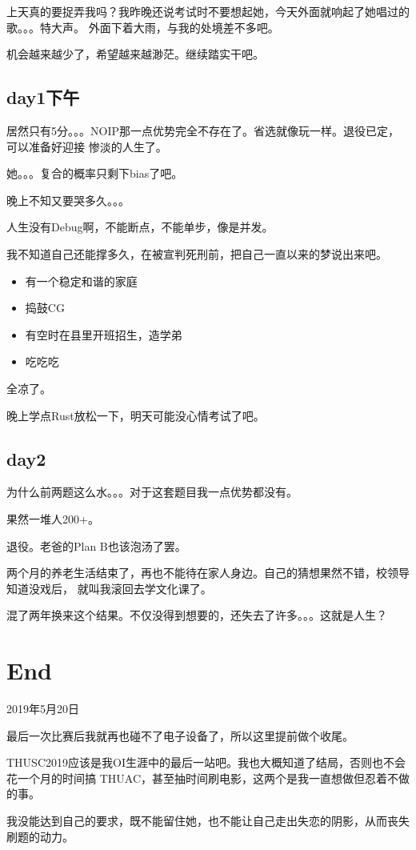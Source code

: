 上天真的要捉弄我吗？我昨晚还说考试时不要想起她，今天外面就响起了她唱过的歌。。。特大声。
外面下着大雨，与我的处境差不多吧。

机会越来越少了，希望越来越渺茫。继续踏实干吧。
\subsection{day1下午}
居然只有5分。。。NOIP那一点优势完全不存在了。省选就像玩一样。退役已定，可以准备好迎接
惨淡的人生了。

她。。。复合的概率只剩下bias了吧。

晚上不知又要哭多久。。。

人生没有Debug啊，不能断点，不能单步，像是并发。

我不知道自己还能撑多久，在被宣判死刑前，把自己一直以来的梦说出来吧。

\begin{itemize}
    \item 有一个稳定和谐的家庭
    \item 捣鼓CG
    \item 有空时在县里开班招生，造学弟
    \item 吃吃吃
\end{itemize}

全凉了。

晚上学点Rust放松一下，明天可能没心情考试了吧。
\subsection{day2}
为什么前两题这么水。。。对于这套题目我一点优势都没有。

果然一堆人200+。

退役。老爸的Plan B也该泡汤了罢。

两个月的养老生活结束了，再也不能待在家人身边。自己的猜想果然不错，校领导知道没戏后，
就叫我滚回去学文化课了。

混了两年换来这个结果。不仅没得到想要的，还失去了许多。。。这就是人生？
\section{End}
2019年5月20日

最后一次比赛后我就再也碰不了电子设备了，所以这里提前做个收尾。

THUSC2019应该是我OI生涯中的最后一站吧。我也大概知道了结局，否则也不会花一个月的时间搞
THUAC，甚至抽时间刷电影，这两个是我一直想做但忍着不做的事。

我没能达到自己的要求，既不能留住她，也不能让自己走出失恋的阴影，从而丧失刷题的动力。

